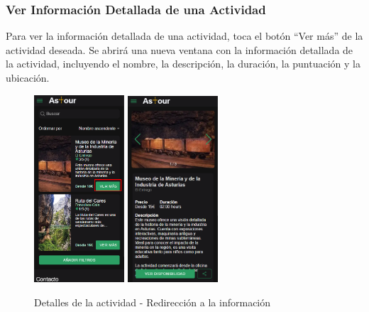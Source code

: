 \subsubsection{Ver Información Detallada de una Actividad}
Para ver la información detallada de una actividad, toca el botón “Ver más” de la actividad deseada.
Se abrirá una nueva ventana con la información detallada de la actividad, incluyendo el nombre, la descripción, la duración, la puntuación y la ubicación.
\begin{figure}[H]
	\centering
	\includegraphics[width=0.3\textwidth]{7-Construccion/Manuales/mobile/ver mas.png}
	\includegraphics[width=0.3\textwidth]{7-Construccion/Manuales/mobile/detalles.png}
	\caption{Detalles de la actividad - Redirección a la información }
\end{figure}


